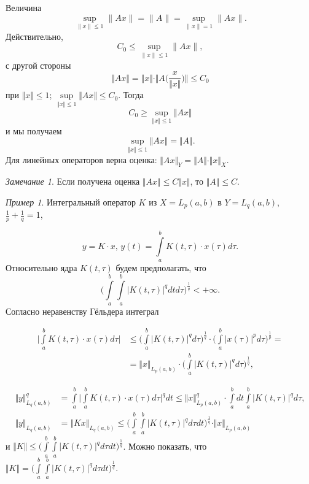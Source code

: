 \documentclass[12pt,a4paper,titlepage,oneside]{book}
\theoremstyle{definition}
\theoremstyle{plain}
\theoremstyle{break}
\theoremstyle{remark}
\newtheorem*{remark}{Замечание}
\theoremstyle{remark}
\newtheorem*{example}{Пример}
\theoremstyle{remark}
\theoremstyle{remark}
\theoremstyle{plain}
\theoremstyle{plain}
\begin{document}
Величина 
$$\underset{\lVert x \rVert \leqslant 1}{\sup}\lVert Ax \rVert = \lVert A \rVert = \underset{\lVert x \rVert = 1}{\sup}\lVert Ax \rVert.$$
Действительно,
$$C_0 \leqslant \underset{\lVert x \rVert \leqslant 1}{\sup}\lVert Ax \rVert,$$
с другой стороны
$$\Vert Ax \Vert=
\Vert x \Vert \cdot \Vert A \big( \frac{x}{\Vert x \Vert} \big) \Vert \leqslant C_0$$
при $\Vert x \Vert \leqslant 1$; 
$\underset{\Vert x\Vert \leqslant 1}{\sup}\Vert Ax \Vert \leqslant C_0$.
Тогда
$$C_0 \geqslant\underset{\Vert x\Vert \leqslant 1}{\sup}\Vert Ax \Vert$$
и мы получаем 
$$\underset{\Vert x\Vert \leqslant 1}{\sup}\Vert Ax \Vert =\Vert A \Vert.$$
Для линейных операторов верна оценка: $\Vert Ax \Vert _{Y} =\Vert A \Vert \cdot \Vert x \Vert_{X} $.

\begin{remark}
Если получена оценка  $\Vert Ax \Vert \leqslant {C}  \Vert x \Vert$, то $\Vert A \Vert \leqslant {C} $.
\end{remark}

\begin{example}
Интегральный оператор $K$ из $X=L_p(a,b)$ в $Y=L_q(a,b)$, $
\frac{1}{p}+\frac{1}{q}=1$,

$$y=K\cdot x \mbox{, } y(t)=\displaystyle\int\limits_a^b K(t,\tau)\cdot x(\tau)d\tau.$$
Относительно ядра $K(t,\tau)$ будем предполагать, что 
$${ \Big( \displaystyle\int\limits_a^b \displaystyle\int\limits_a^b { \big\vert K(t,\tau) \big\vert} ^q dtd\tau \Big) ^\frac{1}{q}} < +\infty.$$
Согласно неравенству Гёльдера интеграл

\begin{align*}
\Big\vert \displaystyle\int\limits_a^b K(t,\tau)\cdot x(\tau)d\tau \Big\vert &\leqslant \Big( \displaystyle\int\limits_a^b { \big\vert K(t,\tau) \big\vert}^q d\tau \Big)^\frac{1}{q} \cdot \Big( \displaystyle\int\limits_a^b { \big\vert x(\tau) \big\vert} ^p d\tau \Big)^\frac{1}{p} =\\
&= \Vert x \Vert _{L_p(a,b)} \cdot \Big( \displaystyle\int\limits_a^b {\big\vert K(t,\tau) \big\vert}^q d\tau \Big)^\frac{1}{q}
,
\end{align*}

\begin{align*}
{\Vert y \Vert}^q _{L_q(a,b)} &=\displaystyle\int\limits_a^b { \Big\vert \displaystyle\int\limits_a^b K(t,\tau)\cdot x(\tau) d\tau \Big\vert^{q}} dt \leqslant {\Vert x \Vert}^q _{L_p(a,b)} \cdot \displaystyle\int\limits_a^b dt \displaystyle\int\limits_a^b {\vert K(t,\tau)\vert} ^q d\tau,\\
{\Vert y \Vert}_{L_q(a,b)} &=
{\Vert Kx\Vert}_{L_q(a,b)} \leqslant { \Big( \displaystyle\int\limits_a^b \displaystyle\int\limits_a^b { \big\vert K(t,\tau) \big\vert} ^q d\tau dt \Big)^\frac{1}{q}}\cdot \Vert x \Vert _{L_p(a,b)}
\end{align*}
и $\Vert K \Vert \leqslant {\Big( \displaystyle\int\limits_a^b \displaystyle\int\limits_a^b { \big\vert K(t,\tau) \big\vert} ^q d\tau dt \Big)^\frac{1}{q}}$.
Можно показать, что $\Vert K \Vert = 
{ \Big( \displaystyle\int\limits_a^b \displaystyle\int\limits_a^b { \big\vert K(t,\tau) \big\vert} ^q d\tau dt \Big)^\frac{1}{q}}.$
\end{example}
\end{document}
